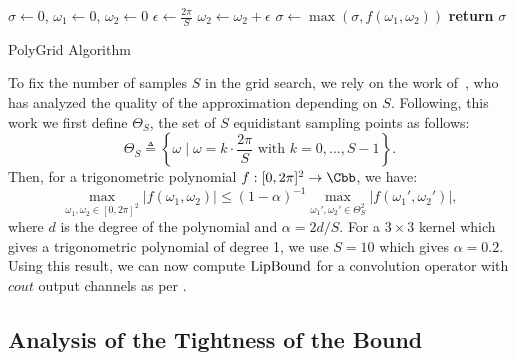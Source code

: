 \begin{algorithm}[htb]
  \begin{algorithmic}[1]
      \State $\sigma \gets 0$, $\omega_1 \gets 0$, $\omega_2 \gets 0$ $\epsilon \gets \frac{2\pi}{S}$
	  \State $\omega_2 \gets \omega_2 + \epsilon$
	  \State $\sigma \gets \max( \sigma, f(\omega_1, \omega_2))$
	\EndFor
      \EndFor
      \State \textbf{return} $\sigma$ 
    \EndProcedure
  \end{algorithmic}
  \caption{PolyGrid Algorithm}
  \label{algorithm:ch5-polygrid}
\end{algorithm}


To fix the number of samples $S$ in the grid search, we rely on the work of~\cite{pfister2018bounding}, who has analyzed the quality of the approximation depending on $S$.
Following, this work we first define $\Theta_S$, the set of $S$ equidistant sampling points as follows:
\begin{equation}
  \Theta_S \triangleq \left\{ \omega \mid \omega = k \cdot \frac{2\pi}{S} \mbox{ with }  k = 0, \dots, S-1 \right\}.
\end{equation}
Then, for a trigonometric polynomial $f: [0, 2\pi]^2 \rightarrow \Cbb$, we have:
\begin{equation}
  \max_{\omega_1, \omega_2 \in [0,2\pi]^2} \left| f(\omega_1, \omega_2) \right| \leq (1 - \alpha)^{-1} \max_{\omega_1', \omega_2' \in \Theta_S^2} \left| f(\omega_1', \omega_2') \right|,
\end{equation}
where $d$ is the degree of the polynomial and $\alpha = 2d / S$.
For a $3\times3$ kernel which gives a trigonometric polynomial of degree 1, we use $S = 10$ which gives $\alpha = 0.2$.
Using this result, we can now compute $\mathrm{LipBound}$ for a convolution operator with $cout$ output channels as per .
 


\subsection{Analysis of the Tightness of the Bound}
\label{subsection:ch2-analysis_of_the_tightness_of_the_bound}

